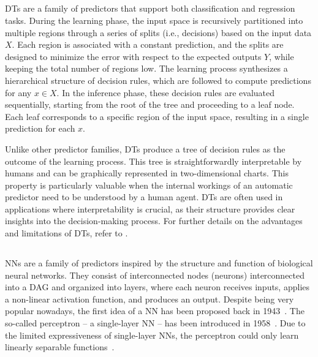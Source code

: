 \subsection{}\label{subsec:decision-trees}
%
\Glspl{DT} are a family of predictors that support both classification and regression tasks.
%
During the learning phase, the input space is recursively partitioned into multiple regions through a series of splits (i.e., decisions) based on the input data \(X\).
%
Each region is associated with a constant prediction, and the splits are designed to minimize the error with respect to the expected outputs \(Y\), while keeping the total number of regions low.
%
The learning process synthesizes a hierarchical structure of decision rules, which are followed to compute predictions for any \(x \in X\).
%
In the inference phase, these decision rules are evaluated sequentially, starting from the root of the tree and proceeding to a leaf node.
%
Each leaf corresponds to a specific region of the input space, resulting in a single prediction for each \(x\).

Unlike other predictor families, \glspl{DT} produce a tree of decision rules as the outcome of the learning process.
%
This tree is straightforwardly interpretable by humans and can be graphically represented in two-dimensional charts.
%
This property is particularly valuable when the internal workings of an automatic predictor need to be understood by a human agent.
%
\Glspl{DT} are often used in applications where interpretability is crucial, as their structure provides clear insights into the decision-making process.
%
For further details on the advantages and limitations of \glspl{DT}, refer to .


\subsection{}\label{subsec:random-forests}

\subsection{}\label{subsec:svm}

\subsection{}\label{subsec:neural-networks}
%
\Glspl{NN} are a family of predictors inspired by the structure and function of biological neural networks.
%
They consist of interconnected nodes (neurons) interconnected into a \gls{DAG} and organized into layers, where each neuron receives inputs, applies a non-linear activation function, and produces an output.
%
Despite being very popular nowadays, the first idea of a \gls{NN} has been proposed back in 1943~\cite{mcculloch1943logical}.
%
The so-called perceptron -- a single-layer \gls{NN} -- has been introduced in 1958~\cite{rosenblatt1958perceptron}.
%
Due to the limited expressiveness of single-layer \glspl{NN}, the perceptron could only learn linearly separable functions~\cite{DBLP:books/daglib/0066902}.

